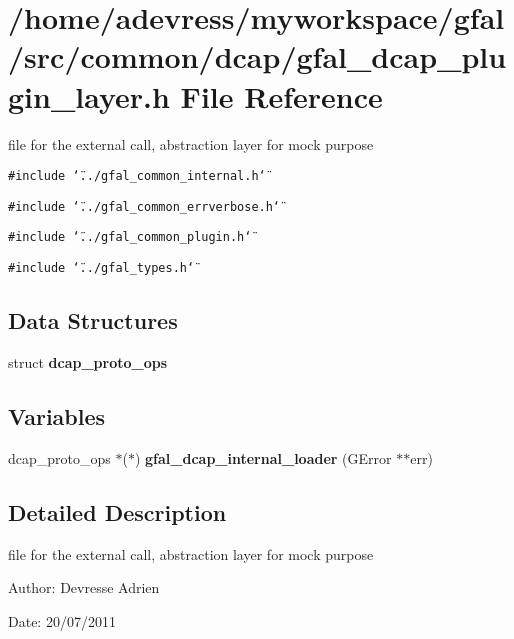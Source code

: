 \section{/home/adevress/myworkspace/gfal/src/common/dcap/gfal\_\-dcap\_\-plugin\_\-layer.h File Reference}
\label{gfal__dcap__plugin__layer_8h}
file for the external call, abstraction layer for mock purpose 

{\tt \#include \char`\"{}../gfal\_\-common\_\-internal.h\char`\"{}}\par
{\tt \#include \char`\"{}../gfal\_\-common\_\-errverbose.h\char`\"{}}\par
{\tt \#include \char`\"{}../gfal\_\-common\_\-plugin.h\char`\"{}}\par
{\tt \#include \char`\"{}../gfal\_\-types.h\char`\"{}}\par
\subsection*{Data Structures}
\begin{CompactItemize}
\item 
struct \textbf{dcap\_\-proto\_\-ops}
\end{CompactItemize}
\subsection*{Variables}
\begin{CompactItemize}
\item 
dcap\_\-proto\_\-ops $\ast$($\ast$) \textbf{gfal\_\-dcap\_\-internal\_\-loader} (GError $\ast$$\ast$err)\label{gfal__dcap__plugin__layer_8h_613ae4b8bc8b68f6578a1451f436cc4f}

\end{CompactItemize}


\subsection{Detailed Description}
file for the external call, abstraction layer for mock purpose 

\begin{Desc}
\item[Author:]Devresse Adrien \end{Desc}
\begin{Desc}
\item[Date:]20/07/2011 \end{Desc}
